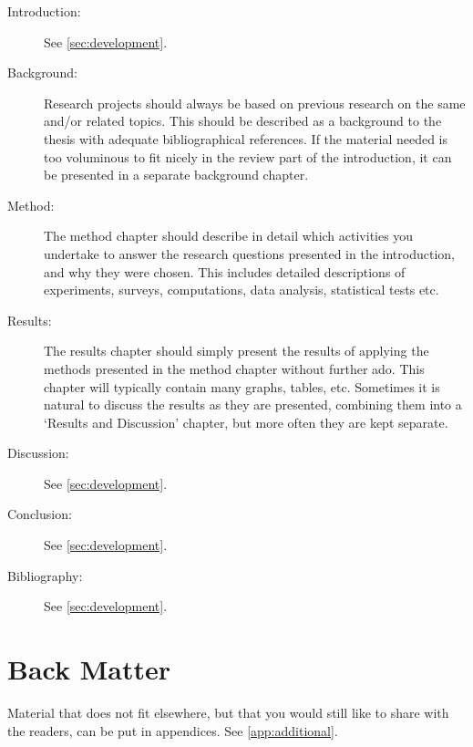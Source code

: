 \begin{description}
    \item[Introduction:] See \cref{sec:development}.
    \item[Background:] Research projects should always be based on previous research on the same and/or related topics. This should be described as a background to the thesis with adequate bibliographical references. If the material needed is too voluminous to fit nicely in the review part of the introduction, it can be presented in a separate background chapter.
    \item[Method:] The method chapter should describe in detail which activities you undertake to answer the research questions presented in the introduction, and why they were chosen. This includes detailed descriptions of experiments, surveys, computations, data analysis, statistical tests etc.
    \item[Results:] The results chapter should simply present the results of applying the methods presented in the method chapter without further ado. This chapter will typically contain many graphs, tables, etc. Sometimes it is natural to discuss the results as they are presented, combining them into a `Results and Discussion' chapter, but more often they are kept separate.
    \item[Discussion:] See \cref{sec:development}.
    \item[Conclusion:] See \cref{sec:development}.
    \item[Bibliography:] See \cref{sec:development}.
\end{description}

\section{Back Matter}

Material that does not fit elsewhere, but that you would still like to share with the readers, can be put in appendices. See \cref{app:additional}.

